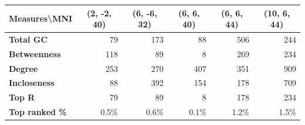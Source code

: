 \begin{table}[]
\renewcommand{\arraystretch}{1.2} %
\setlength{\tabcolsep}{8pt} %
\centering
\begin{tabular}{|l|r|r|r|r|r|}
\hline
\multicolumn{1}{|c|}{\textbf{Measures\textbackslash MNI}} & \multicolumn{1}{c|}{\textbf{(2, -2, 40)}} & \multicolumn{1}{c|}{\textbf{(6, -6, 32)}} & \multicolumn{1}{c|}{\textbf{(6, 6, 40)}} & \multicolumn{1}{c|}{\textbf{(6, 6, 44)}} & \multicolumn{1}{c|}{\textbf{(10, 6, 44)}} \\ \hline
\textbf{Total GC}                                                & 79                                        & 173                                       & 88                                       & 506                                      & 244                                       \\ \hline
\textbf{Betweenness}                                             & 118                                       & 89                                        & 8                                        & 269                                      & 234                                       \\ \hline
\textbf{Degree}                                                  & 253                                       & 270                                       & 407                                      & 351                                      & 909                                       \\ \hline
\textbf{Incloseness}                                             & 88                                        & 392                                       & 154                                      & 178                                      & 709                                       \\ \hline
\textbf{Top R}                                                   & 79                                        & 89                                        & 8                                        & 178                                      & 234                                       \\ \hline
\textbf{Top ranked \%}                                           & 0.5\%                                     & 0.6\%                                     & 0.1\%                                    & 1.2\%                                    & 1.5\%                                     \\ \hline

\end{tabular}
\end{table}
